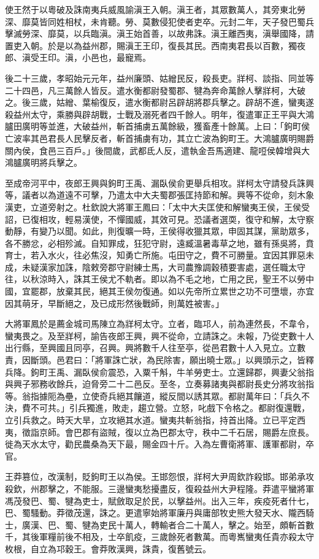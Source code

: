 \begin{pinyinscope}
使王然于以粵破及誅南夷兵威風諭滇王入朝。滇王者，其眾數萬人，其旁東北勞深、靡莫皆同姓相杖，未肯聽。勞、莫數侵犯使者吏卒。元封二年，天子發巴蜀兵擊滅勞深、靡莫，以兵臨滇。滇王始首善，以故弗誅。滇王離西夷，滇舉國降，請置吏入朝。於是以為益州郡，賜滇王王印，復長其民。西南夷君長以百數，獨夜郎、滇受王印。滇，小邑也，最寵焉。

後二十三歲，孝昭始元元年，益州廉頭、姑繒民反，殺長吏。牂柯、談指、同並等二十四邑，凡三萬餘人皆反。遣水衡都尉發蜀郡、犍為奔命萬餘人擊牂柯，大破之。後三歲，姑繒、葉榆復反，遣水衡都尉呂辟胡將郡兵擊之。辟胡不進，蠻夷遂殺益州太守，乘勝與辟胡戰，士戰及溺死者四千餘人。明年，復遣軍正王平與大鴻臚田廣明等並進，大破益州，斬首捕虜五萬餘級，獲畜產十餘萬。上曰：「鉤町侯亡波率其邑君長人民擊反者，斬首捕虜有功，其立亡波為鉤町王。大鴻臚廣明賜爵關內侯，食邑三百戶。」後間歲，武都氐人反，遣執金吾馬適建、龍哣侯韓增與大鴻臚廣明將兵擊之。

至成帝河平中，夜郎王興與鉤町王禹、漏臥侯俞更舉兵相攻。牂柯太守請發兵誅興等，議者以為道遠不可擊，乃遣太中大夫蜀郡張匡持節和解。興等不從命，刻木象漢吏，立道旁射之。杜欽說大將軍王鳳曰：「太中大夫匡使和解蠻夷王侯，王侯受詔，已復相攻，輕易漢使，不憚國威，其效可見。恐議者選耎，復守和解，太守察動靜，有變乃以聞。如此，則復曠一時，王侯得收獵其眾，申固其謀，黨助眾多，各不勝忿，必相殄滅。自知罪成，狂犯守尉，遠臧溫暑毒草之地，雖有孫吳將，賁育士，若入水火，往必焦沒，知勇亡所施。屯田守之，費不可勝量。宜因其罪惡未成，未疑漢家加誅，陰敕旁郡守尉練士馬，大司農豫調穀積要害處，選任職太守往，以秋涼時入，誅其王侯尤不軌者。即以為不毛之地，亡用之民，聖王不以勞中國，宜罷郡，放棄其民，絕其王侯勿復通。如以先帝所立累世之功不可墮壞，亦宜因其萌牙，早斷絕之，及已成形然後戰師，則萬姓被害。」

大將軍鳳於是薦金城司馬陳立為牂柯太守。立者，臨邛人，前為連然長，不韋令，蠻夷畏之。及至牂柯，諭告夜郎王興，興不從命，立請誅之。未報，乃從吏數十人出行縣，至興國且同亭，召興。興將數千人往至亭，從邑君數十人入見立。立數責，因斷頭。邑君曰：「將軍誅亡狀，為民除害，願出曉士眾。」以興頭示之，皆釋兵降。鉤町王禹、漏臥侯俞震恐，入粟千斛，牛羊勞吏士。立還歸郡，興妻父翁指與興子邪務收餘兵，迫脅旁二十二邑反。至冬，立奏募諸夷與都尉長史分將攻翁指等。翁指據阨為壘，立使奇兵絕其饟道，縱反間以誘其眾。都尉萬年曰：「兵久不決，費不可共。」引兵獨進，敗走，趨立營。立怒，叱戲下令格之。都尉復還戰，立引兵救之。時天大旱，立攻絕其水道。蠻夷共斬翁指，持首出降。立已平定西夷，徵詣京師。會巴郡有盜賊，復以立為巴郡太守，秩中二千石居，賜爵左庶長。徙為天水太守，勸民農桑為天下最，賜金四十斤。入為左曹衛將軍、護軍都尉，卒官。

王莽篡位，改漢制，貶鉤町王以為侯。王邯怨恨，牂柯大尹周欽詐殺邯。邯弟承攻殺欽，州郡擊之，不能服。三邊蠻夷愁擾盡反，復殺益州大尹程隆。莽遣平蠻將軍馮茂發巴、蜀、犍為吏士，賦斂取足於民，以擊益州。出入三年，疾疫死者什七，巴、蜀騷動。莽徵茂還，誅之。更遣寧始將軍廉丹與庸部牧史熊大發天水、隴西騎士，廣漢、巴、蜀、犍為吏民十萬人，轉輸者合二十萬人，擊之。始至，頗斬首數千，其後軍糧前後不相及，士卒飢疫，三歲餘死者數萬。而粵嶲蠻夷任貴亦殺太守枚根，自立為邛穀王。會莽敗漢興，誅貴，復舊號云。


\end{pinyinscope}
